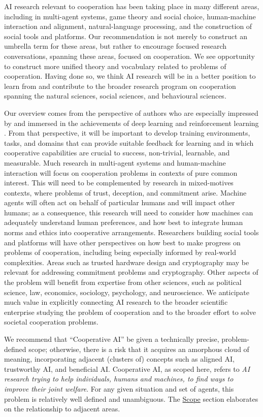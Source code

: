 \documentclass[11pt, a4paper, logo, onecolumn, nonumbering]{deepmind}
\begin{document}
AI research relevant to cooperation has been taking place in many different areas, including in multi-agent systems, game theory and social choice, human-machine interaction and alignment, natural-language processing, and the construction of social tools and platforms. Our recommendation is not merely to construct an umbrella term for these areas, but rather to encourage focused research conversations, spanning these areas, focused on cooperation. We see opportunity to construct more unified theory and vocabulary related to problems of cooperation. Having done so, we think AI research will be in a better position to learn from and contribute to the broader research program on cooperation spanning the natural sciences, social sciences, and behavioural sciences. 

Our overview comes from the perspective of authors who are especially impressed by and immersed in the achievements of deep learning \cite{sejnowski2020unreasonable} and reinforcement learning \cite{sutton2020reinforcement}. From that perspective, 
it will be important to develop training environments, tasks, and domains that can provide suitable feedback for learning and in which cooperative capabilities are crucial to success, non-trivial, learnable, and measurable. Much research in multi-agent systems and human-machine interaction will focus on cooperation problems in contexts of pure common interest. This will need to be complemented by research in mixed-motives contexts, where problems of trust, deception, and commitment arise. Machine agents will often act on behalf of particular humans and will impact other humans; as a consequence, this research will need to consider how machines can adequately understand human preferences, and how best to integrate human norms and ethics into cooperative arrangements. Researchers building social tools and platforms will have other perspectives on how best to make progress on problems of cooperation, including being especially informed by real-world complexities. Areas such as trusted hardware design and cryptography may be relevant for addressing commitment problems and cryptography. Other aspects of the problem will benefit from expertise from other sciences, such as political science, law, economics, sociology, psychology, and neuroscience. We anticipate much value in explicitly connecting AI research to the broader scientific enterprise studying the problem of cooperation and to the broader effort to solve societal cooperation problems.

We recommend that ``Cooperative AI'' be given a technically precise, problem-defined scope; otherwise, there is a risk that it acquires an amorphous cloud of meaning, incorporating adjacent (clusters of) concepts such as aligned AI, trustworthy AI, and beneficial AI.  
Cooperative AI, as scoped here, refers to \textit{AI research trying to help individuals, humans and machines, to find ways to improve their joint welfare}. For any given situation and set of agents, this problem is relatively well defined and unambiguous. The \hyperref[section:scope]{Scope} section elaborates on the relationship to adjacent areas.
\end{document}

